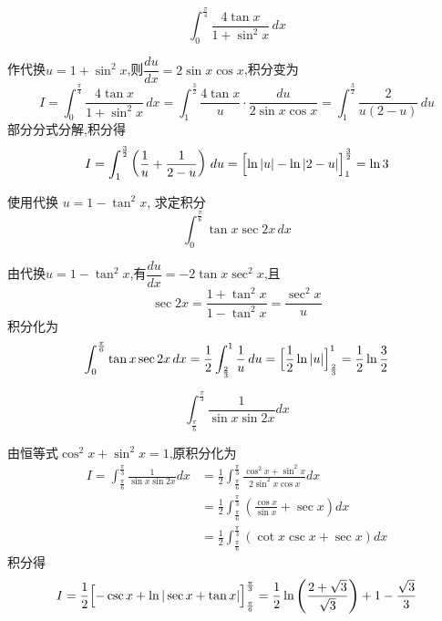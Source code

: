 \begin{questions}
    \question 
    \[
    \int_{0}^{\frac{\pi}{4}} \frac{4\tan x}{1+\sin^2 x} \,dx
    \]
    \begin{solution}
        作代换$u = 1 + \sin^2 x$,则$\dfrac{du}{dx} = 2\sin x \cos x$,积分变为
        \[
        I=\int_{0}^{\frac{\pi}{4}} \frac{4\tan x}{1+\sin^2 x} \,dx = \int_{1}^{\frac{3}{2}} \frac{4\tan x}{u} \cdot \frac{du}{2\sin x \cos x} = \int_{1}^{\frac{3}{2}} \frac{2}{u(2-u)} \,du
        \]
        部分分式分解,积分得
        \[
        I=\int_{1}^{\frac{3}{2}} \left( \frac{1}{u} + \frac{1}{2-u} \right) \,du 
        = \Bigl[\ln|u| - \ln|2-u| \Bigr]_{1}^{\frac{3}{2}} = \ln 3
        \]
    \end{solution}

    \question 使用代换 $u = 1 - \tan^2 x$, 求定积分
    \[
    \int_{0}^{\frac{\pi}{6}} \tan x \sec 2x \,dx
    \]
    \begin{solution}
        由代换$u = 1 - \tan^2 x$,有$\dfrac{du}{dx} = -2\tan x \sec^2 x$,且
        \[
        \sec 2x= \frac{1 + \tan^2 x}{1 - \tan^2 x} = \frac{\sec^2 x}{u}
        \]
        积分化为
        \[
        \int_{0}^{\frac{\pi}{6}} \tan x \sec 2x \,dx = \frac{1}{2} \int_{\frac{2}{3}}^{1} \frac{1}{u} \,du = \Bigl[\frac{1}{2} \ln|u| \Bigr]_{\frac{2}{3}}^{1} = \frac{1}{2} \ln \frac{3}{2}
        \]
    \end{solution}

    \question
    \[
    \int_{\frac{\pi}{6}}^{\frac{\pi}{3}} \frac{1}{\sin x \sin 2x} dx
    \]
    \begin{solution}
        由恒等式$\cos^2 x + \sin^2 x=1$,原积分化为
        \begin{align*}
        I=\int_{\frac{\pi}{6}}^{\frac{\pi}{3}} \frac{1}{\sin x \sin 2x} dx
        &= \frac{1}{2}\int_{\frac{\pi}{6}}^{\frac{\pi}{3}} \frac{\cos^2 x + \sin^2 x}{2\sin^2 x \cos x} dx \\
        &= \frac{1}{2}\int_{\frac{\pi}{6}}^{\frac{\pi}{3}} \left( \frac{\cos x}{\sin x} + \sec x \right) dx \\
        &= \frac{1}{2}\int_{\frac{\pi}{6}}^{\frac{\pi}{3}} \left( \cot x \csc x + \sec x \right) dx
        \end{align*}
        积分得
        \[
        I = \frac{1}{2}\Bigl[ -\csc x + \ln|\sec x + \tan x| \Bigr]_{\frac{\pi}{6}}^{\frac{\pi}{3}} = \frac{1}{2}\ln\left(\frac{2+\sqrt{3}}{\sqrt{3}}\right) + 1 - \frac{\sqrt{3}}{3}
        \]
    \end{solution}


\end{questions}
